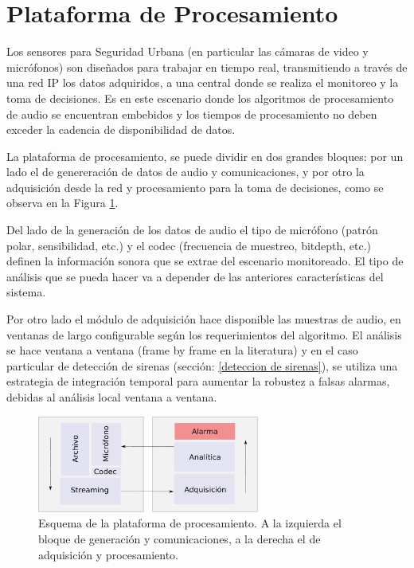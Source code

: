 \documentclass{article}
\begin{document}

\section{Plataforma de Procesamiento}
\label{PP}
Los sensores para Seguridad Urbana (en particular las cámaras de video y micrófonos) son diseñados para trabajar en tiempo real, transmitiendo a través de una red IP los datos adquiridos, a una central donde se realiza el monitoreo y la toma de decisiones. Es en este escenario donde los algoritmos de procesamiento de audio se encuentran embebidos y los tiempos de procesamiento no deben exceder la cadencia de disponibilidad de datos.

\bigskip
La plataforma de procesamiento, se puede dividir en dos grandes bloques: por un lado el de genereración de datos de audio y comunicaciones, y por otro la adquisición desde la red y procesamiento para la toma de decisiones, como se observa en la Figura \ref{fig:plataforma_procesamiento}.
\bigskip

Del lado de la generación de los datos de audio el tipo de micrófono (patrón polar, sensibilidad, etc.) y el codec (frecuencia de muestreo, bitdepth, etc.) definen la información sonora que se extrae del escenario monitoreado. El tipo de análisis que se pueda hacer va a depender de las anteriores características del sistema.
\bigskip

Por otro lado el módulo de adquisición hace disponible las muestras de audio, en ventanas de largo configurable según los requerimientos del algoritmo. El análisis se hace ventana a ventana (frame by frame en la literatura) y en el caso particular de detección de sirenas (sección: \ref{deteccion de sirenas}), se utiliza una estrategia de integración temporal para aumentar la robustez a falsas alarmas, debidas al análisis local ventana a ventana.


\begin{figure}[h]
\begin{center}
\includegraphics[width=0.65\textwidth]{plataforma_procesamiento} 
\caption{Esquema de la plataforma de procesamiento. A la izquierda el bloque de generación y comunicaciones, a la derecha el de adquisición y procesamiento.}
\label{fig:plataforma_procesamiento}
\end{center}
\end{figure}
\end{document}
